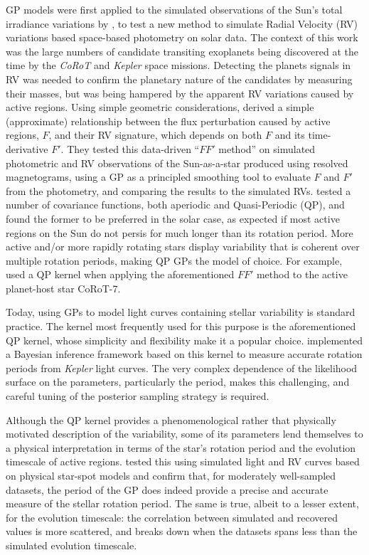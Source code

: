 \documentclass[letterpaper]{ar-1col}
\begin{document}
GP models were first applied to the simulated observations of the Sun's total irradiance variations by \citet{2012MNRAS.419.3147A}, to test a new method to simulate Radial Velocity (RV) variations based space-based photometry on solar data. The context of this work was the large numbers of candidate transiting exoplanets being discovered at the time by the \textit{CoRoT} and \textit{Kepler} space missions. Detecting the planets signals in RV was needed to confirm the planetary nature of the candidates by measuring their masses, but was being hampered by the apparent RV variations caused by active regions. Using simple geometric considerations, \citet{2012MNRAS.419.3147A} derived a simple (approximate) relationship between the flux perturbation caused by active regions, $F$, and their RV signature, which depends on both $F$ and its time-derivative $F'$. They tested this data-driven ``$FF'$ method'' on simulated photometric and RV observations of the Sun-as-a-star produced using resolved magnetograms, using a GP as a principled smoothing tool to evaluate $F$ and $F'$ from the photometry, and comparing the results to the simulated RVs. \citet{2012MNRAS.419.3147A}  tested a number of covariance functions, both aperiodic and Quasi-Periodic (QP), and found the former to be preferred in the solar case, as expected if most active regions on the Sun do not persis for much longer than its rotation period. More active and/or more rapidly rotating stars display variability that is coherent over multiple rotation periods, making QP GPs the model of choice. For example, \citet{2014MNRAS.443.2517H} used a QP kernel when applying the aforementioned $FF'$ method to the active planet-host star CoRoT-7.

Today, using GPs to model light curves containing stellar variability is standard practice. The kernel most frequently used for this purpose is the aforementioned QP kernel, whose simplicity and flexibility make it a popular choice. \citet{2018MNRAS.474.2094A} implemented a Bayesian inference framework based on this kernel to measure accurate rotation periods from \textit{Kepler} light curves. The very complex dependence of the likelihood surface on the parameters, particularly the period, makes this challenging, and careful tuning of the posterior sampling strategy is required.

Although the QP kernel provides a phenomenological rather that physically motivated description of the variability, some of its parameters lend themselves to a physical interpretation in terms of the star's rotation period and the evolution timescale of active regions. \citet{2022MNRAS.tmp.2007N} tested this using simulated light and RV curves based on physical star-spot models and confirm that, for moderately well-sampled datasets, the period of the GP does indeed provide a precise and accurate measure of the stellar rotation period. The same is true, albeit to a lesser extent, for the evolution timescale: the correlation between simulated and recovered values is more scattered, and breaks down when the datasets spans less than the simulated evolution timescale.
\end{document}
